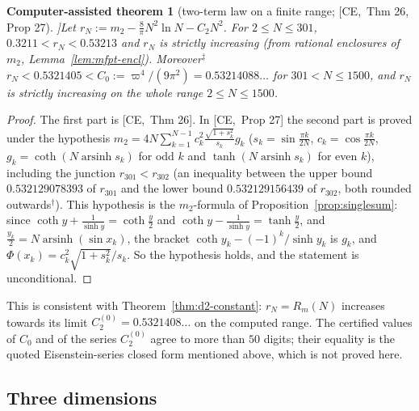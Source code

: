 \documentclass[10pt,a4paper]{article}
\theoremstyle{plain}
\newtheorem{catheorem}[theorem]{Computer-assisted theorem}
\theoremstyle{definition}
\newcommand{\NEW}{\ensuremath{^{\dagger}}}       %
\newcommand{\SYN}{\ensuremath{^{\ddagger}}}      %
\newcommand{\src}[2]{[\textsf{#1},~#2]}           %
\newcommand{\CER}{\textsf{CE}}
\newcommand{\arsinh}{\operatorname{arsinh}}
\begin{document}
\begin{catheorem}[two-term law on a finite range; \src{\CER}{Thm 26, Prop 27}]\label{thm:d2-finite}
Let $r_N:=m_2-\frac8\pi N^2\ln N-C_2N^2$. For $2\le N\le301$, $0.3211<r_N<0.53213$ and $r_N$ is strictly increasing (from rational enclosures of $m_2$, Lemma~\ref{lem:mfpt-encl}). Moreover\SYN\ $r_N<0.5321405<C_0:=\varpi^4/(9\pi^2)=0.53214088\ldots$ for $301<N\le1500$, and $r_N$ is strictly increasing on the whole range $2\le N\le1500$.
\end{catheorem}
\begin{proof}
The first part is \src{\CER}{Thm 26}. In \src{\CER}{Prop 27} the second part is proved under the hypothesis $m_2=4N\sum_{k=1}^{N-1}c_k^2\frac{\sqrt{1+s_k^2}}{s_k}g_k$ ($s_k=\sin\frac{\pi k}{2N}$, $c_k=\cos\frac{\pi k}{2N}$, $g_k=\coth(N\arsinh s_k)$ for odd $k$ and $\tanh(N\arsinh s_k)$ for even $k$), including the junction $r_{301}<r_{302}$ (an inequality between the upper bound $0.532129078393$ of $r_{301}$ and the lower bound $0.532129156439$ of $r_{302}$, both rounded outwards\NEW). This hypothesis is the $m_2$-formula of Proposition~\ref{prop:singlesum}: since $\coth y+\frac1{\sinh y}=\coth\frac y2$ and $\coth y-\frac1{\sinh y}=\tanh\frac y2$, and $\frac{y_k}2=N\arsinh(\sin x_k)$, the bracket $\coth y_k-(-1)^k/\sinh y_k$ is $g_k$, and $\Phi(x_k)=c_k^2\sqrt{1+s_k^2}/s_k$. So the hypothesis holds, and the statement is unconditional.
\end{proof}
This is consistent with Theorem~\ref{thm:d2-constant}: $r_N=R_m(N)$ increases towards its limit $C_2^{(0)}=0.5321408\ldots$ on the computed range. The certified values of $C_0$ and of the series $C_2^{(0)}$ agree to more than $50$ digits; their equality is the quoted Eisenstein-series closed form mentioned above, which is not proved here.

\subsection{Three dimensions}
\end{document}
